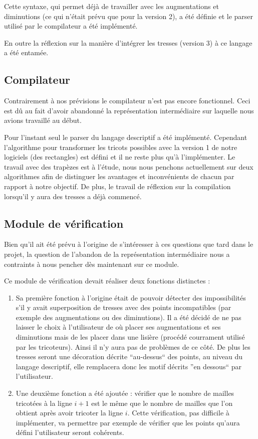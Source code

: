 \documentclass{article}
\begin{document}
Cette syntaxe, qui permet déjà de travailler avec les augmentations et diminutions (ce qui n'était prévu que pour la version 2), a été définie et le parser utilisé par le compilateur a été implémenté.

En outre la réflexion sur la manière d'intégrer les tresses (version 3) à ce langage a été entamée. %


\subsection{Compilateur}

Contrairement à nos prévisions le compilateur n'est pas encore fonctionnel. Ceci est dû au fait d'avoir abandonné la représentation intermédiaire sur laquelle nous avions travaillé au début.

Pour l'instant seul le parser du langage descriptif a été implémenté. Cependant l'algorithme pour transformer les tricots possibles avec la version 1 de notre logiciels (des rectangles) est défini et il ne reste plus qu'à l'implémenter. Le travail avec des trapèzes est à l'étude, nous nous penchons actuellement sur deux algorithmes afin de distinguer les avantages et inconvénients de chacun par rapport à notre objectif. %
De plus, le travail de réflexion sur la compilation lorsqu'il y aura des tresses a déjà commencé.

\subsection{Module de vérification}

Bien qu'il ait été prévu à l'origine de s'intéresser à ces questions que tard dans le projet, la question de l'abandon de la représentation intermédiaire nous a contraints à nous pencher dès maintenant sur ce module.

Ce module de vérification devait réaliser deux fonctions distinctes :

\begin{enumerate}
 \item Sa première fonction à l'origine était de pouvoir détecter des impossibilités s'il y avait superposition de tresses avec des points incompatibles (par exemple des augmentations ou des diminutions). Il a été décidé de ne pas laisser le choix à l'utilisateur de où placer ses augmentations et ses diminutions mais de les placer dans une lisière (procédé courrament utilisé par les tricoteurs). Ainsi il n'y aura pas de problèmes de ce côté. De plus les tresses seront une décoration décrite ``au-dessus`` des points, au niveau du langage descriptif, elle remplacera donc les motif décrits ''en dessous`` par l'utilisateur.

 \item Une deuxième fonction a été ajoutée : vérifier que le nombre de mailles tricotées à la ligne $i+1$ est le même que le nombre de mailles que l'on obtient après avoir tricoter la ligne $i$. Cette vérification, pas difficile à implémenter, va permettre par exemple de vérifier que les points qu'aura défini l'utilisateur seront cohérents.
\end{enumerate}
\end{document}
